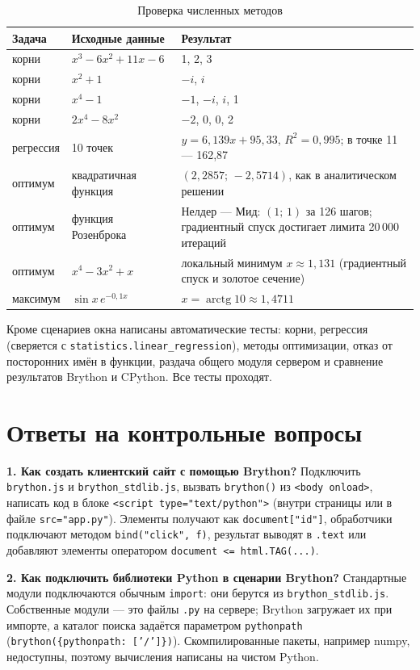 \documentclass[14pt,a4paper]{extarticle}
\begin{document}
\begin{table}[H]
\caption{Проверка численных методов}
\label{tab:results}
\centering
\small
\begin{tabularx}{\textwidth}{lLL}
\toprule
Задача & Исходные данные & Результат \\
\midrule
корни & $x^3-6x^2+11x-6$ & 1, 2, 3 \\
корни & $x^2+1$ & $-i$, $i$ \\
корни & $x^4-1$ & $-1$, $-i$, $i$, 1 \\
корни & $2x^4-8x^2$ & $-2$, 0, 0, 2 \\
регрессия & 10 точек & $y=6{,}139x+95{,}33$, $R^2=0{,}995$; в точке 11 --- 162,87 \\
оптимум & квадратичная функция & $(2{,}2857;\,-2{,}5714)$, как в аналитическом решении \\
оптимум & функция Розенброка & Нелдер --- Мид: $(1;\,1)$ за 126 шагов; градиентный спуск
достигает лимита 20\,000 итераций \\
оптимум & $x^4-3x^2+x$ & локальный минимум $x\approx1{,}131$ (градиентный спуск и золотое
сечение) \\
максимум & $\sin x\,e^{-0{,}1x}$ & $x=\operatorname{arctg}10\approx1{,}4711$ \\
\bottomrule
\end{tabularx}
\end{table}

Кроме сценариев окна написаны автоматические тесты: корни, регрессия (сверяется с
\texttt{statistics.linear\_regression}), методы оптимизации, отказ от посторонних имён в
функции, раздача общего модуля сервером и сравнение результатов Brython и CPython.
Все тесты проходят.

\section{Ответы на контрольные вопросы}

\textbf{1. Как создать клиентский сайт с помощью Brython?} Подключить
\texttt{brython.js} и \texttt{brython\_stdlib.js}, вызвать \texttt{brython()} из
\texttt{<body onload>}, написать код в блоке \texttt{<script type="text/python">}
(внутри страницы или в файле \texttt{src="app.py"}). Элементы получают как
\texttt{document["id"]}, обработчики подключают методом \texttt{bind("click", f)},
результат выводят в \texttt{.text} или добавляют элементы оператором
\texttt{document <= html.TAG(...)}.

\textbf{2. Как подключить библиотеки Python в сценарии Brython?} Стандартные модули
подключаются обычным \texttt{import}: они берутся из \texttt{brython\_stdlib.js}.
Собственные модули --- это файлы \texttt{.py} на сервере; Brython загружает их при
импорте, а каталог поиска задаётся параметром \texttt{pythonpath}
(\texttt{brython(\{pythonpath: ['/']\})}). Скомпилированные пакеты, например numpy,
недоступны, поэтому вычисления написаны на чистом Python.
\end{document}
